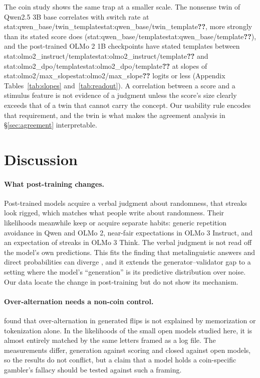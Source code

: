 \documentclass[11pt]{article}
\newcommand{\stat}[1]{\ifcsname stat:#1\endcsname\csname stat:#1\endcsname\else\textbf{??}\fi}
\begin{document}
The coin study shows the same trap at a smaller scale. The nonsense twin of Qwen2.5 3B base correlates with switch rate at \stat{qwen_base/twin_template}, more strongly than its stated score does (\stat{qwen_base/template}), and the post-trained OLMo 2 1B checkpoints have stated templates between \stat{olmo2_instruct/template} and \stat{olmo2_dpo/template} at slopes of \stat{olmo2/max_slope} logits or less (Appendix Tables~\ref{tab:slopes} and~\ref{tab:readout}). A correlation between a score and a stimulus feature is not evidence of a judgment unless the score's size clearly exceeds that of a twin that cannot carry the concept. Our usability rule encodes that requirement, and the twin is what makes the agreement analysis in \S\ref{sec:agreement} interpretable.

\section{Discussion}

\paragraph{What post-training changes.} Post-trained models acquire a verbal judgment about randomness, that streaks look rigged, which matches what people write about randomness. Their likelihoods meanwhile keep or acquire separate habits: generic repetition avoidance in Qwen and OLMo 2, near-fair expectations in OLMo 3 Instruct, and an expectation of streaks in OLMo 3 Think. The verbal judgment is not read off the model's own predictions. This fits the finding that metalinguistic answers and direct probabilities can diverge \citep{hu2023prompting}, and it extends the generator--validator gap \citep{li2024benchmarking} to a setting where the model's ``generation'' is its predictive distribution over noise. Our data locate the change in post-training but do not show its mechanism.

\paragraph{Over-alternation needs a non-coin control.} \citet{vankoevering2024heads} found that over-alternation in generated flips is not explained by memorization or tokenization alone. In the likelihoods of the small open models studied here, it is almost entirely matched by the same letters framed as a log file. The measurements differ, generation against scoring and closed against open models, so the results do not conflict, but a claim that a model holds a coin-specific gambler's fallacy should be tested against such a framing.
\end{document}
